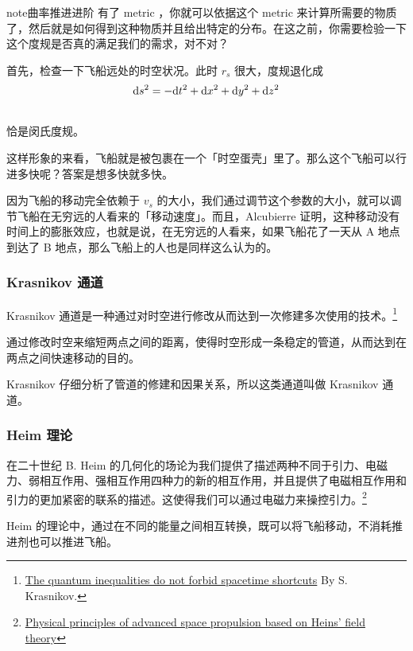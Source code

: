 \documentclass[letterpaper,10pt]{sphinxmanual}
\begin{document}
\begin{notice}{note}{曲率推进进阶}
有了 metric ，你就可以依据这个 metric 来计算所需要的物质了，然后就是如何得到这种物质并且给出特定的分布。在这之前，你需要检验一下这个度规是否真的满足我们的需求，对不对？

首先，检查一下飞船远处的时空状况。此时 $r_s$ 很大，度规退化成
\begin{gather}
\begin{split}\mathrm ds^2 = -\mathrm dt^2+\mathrm dx ^2 + \mathrm dy^2 + \mathrm dz^2\end{split}\notag\\\begin{split}\end{split}\notag
\end{gather}
恰是闵氏度规。

这样形象的来看，飞船就是被包裹在一个「时空蛋壳」里了。那么这个飞船可以行进多快呢？答案是想多快就多快。

因为飞船的移动完全依赖于 $v_s$ 的大小，我们通过调节这个参数的大小，就可以调节飞船在无穷远的人看来的「移动速度」。而且，Alcubierre 证明，这种移动没有时间上的膨胀效应，也就是说，在无穷远的人看来，如果飞船花了一天从 A 地点到达了 B 地点，那么飞船上的人也是同样这么认为的。
\end{notice}


\subsubsection{Krasnikov 通道}
\label{tech:index-5}\label{tech:krasnikov}
Krasnikov 通道是一种通过对时空进行修改从而达到一次修建多次使用的技术。\footnote{
\href{http://arxiv.org/abs/gr-qc/0207057}{The quantum inequalities do not forbid spacetime shortcuts} By S. Krasnikov.
}

通过修改时空来缩短两点之间的距离，使得时空形成一条稳定的管道，从而达到在两点之间快速移动的目的。

Krasnikov 仔细分析了管道的修建和因果关系，所以这类通道叫做 Krasnikov 通道。


\subsubsection{Heim 理论}
\label{tech:index-6}\label{tech:heim}
在二十世纪 B. Heim 的几何化的场论为我们提供了描述两种不同于引力、电磁力、弱相互作用、强相互作用四种力的新的相互作用，并且提供了电磁相互作用和引力的更加紧密的联系的描述。这使得我们可以通过电磁力来操控引力。\footnote{
\href{http://www.hpcc-space.com/publications/documents/PrinciplesOfAdvancedSpacePropulsionAIAA-paper-2002-4094.pdf}{Physical principles of advanced space propulsion based on Heins' field theory}
}

Heim 的理论中，通过在不同的能量之间相互转换，既可以将飞船移动，不消耗推进剂也可以推进飞船。



\renewcommand{\indexname}{索引}
\printindex
\end{document}
